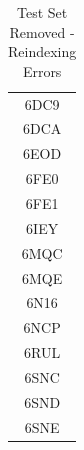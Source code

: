 \documentclass[journal=jcisd8,manuscript=article]{achemso}
\begin{document}
\begin{center}
    \begin{table}[ht]
        \centering
        \begin{tabular}{|c|}
            \hline
            6DC9 \\
            6DCA \\
            6EOD \\
            6FE0 \\
            6FE1 \\
            6IEY \\
            6MQC \\
            6MQE \\
            6N16 \\
            6NCP \\
            6RUL \\
            6SNC \\
            6SND \\
            6SNE \\
            \hline
        \end{tabular}
        \caption{Test Set Removed - Reindexing Errors}
        \label{table:testreindex}
    \end{table}
\end{center}
\clearpage
\end{document}
